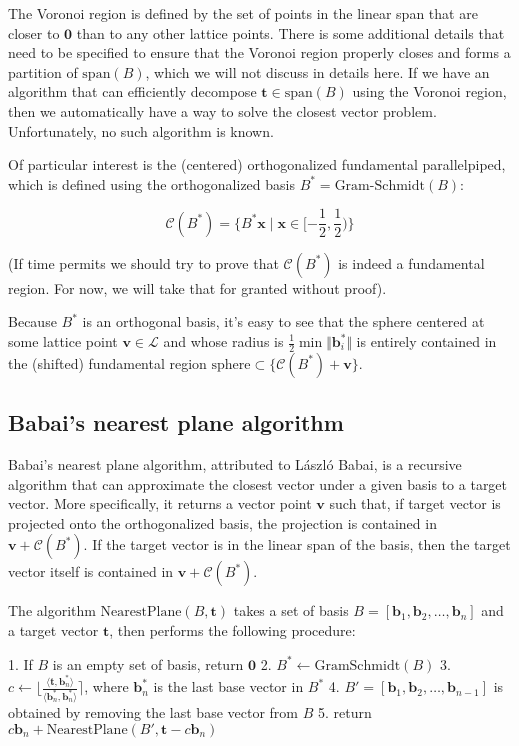 The Voronoi region is defined by the set of points in the linear span that are closer to $\mathbf{0}$ than to any other lattice points. There is some additional details that need to be specified to ensure that the Voronoi region properly closes and forms a partition of $\text{span}(B)$, which we will not discuss in details here. If we have an algorithm that can efficiently decompose $\mathbf{t} \in \text{span}(B)$ using the Voronoi region, then we automatically have a way to solve the closest vector problem. Unfortunately, no such algorithm is known.

Of particular interest is the (centered) orthogonalized fundamental parallelpiped, which is defined using the orthogonalized basis $B^\ast = \text{Gram-Schmidt}(B)$:

$$
\mathcal{C}(B^\ast) = \{B^\ast\mathbf{x} \mid \mathbf{x} \in [-\frac{1}{2}, \frac{1}{2})\}
$$

(If time permits we should try to prove that $\mathcal{C}(B^\ast)$ is indeed a fundamental region. For now, we will take that for granted without proof).

Because $B^\ast$ is an orthogonal basis, it's easy to see that the sphere centered at some lattice point $\mathbf{v} \in \mathcal{L}$ and whose radius is $\frac{1}{2}\min \Vert \mathbf{b}_i^\ast\Vert$ is entirely contained in the (shifted) fundamental region $\text{sphere} \subset \{\mathcal{C}(B^\ast) + \mathbf{v}\}$.

\subsection{Babai's nearest plane algorithm}
Babai's nearest plane algorithm, attributed to László Babai, is a recursive algorithm that can approximate the closest vector under a given basis to a target vector. More specifically, it returns a vector point $\mathbf{v}$ such that, if target vector is projected onto the orthogonalized basis, the projection is contained in $\mathbf{v} + \mathcal{C}(B^\ast)$. If the target vector is in the linear span of the basis, then the target vector itself is contained in $\mathbf{v} + \mathcal{C}(B^\ast)$.

The algorithm $\text{NearestPlane}(B, \mathbf{t})$ takes a set of basis $B = [\mathbf{b}_1, \mathbf{b}_2, \ldots, \mathbf{b}_{n}]$ and a target vector $\mathbf{t}$, then performs the following procedure:

1. If $B$ is an empty set of basis, return $\mathbf{0}$
2. $B^\ast \leftarrow \text{GramSchmidt}(B)$
3. $c \leftarrow \lfloor \frac{\langle\mathbf{t}, \mathbf{b}_n^\ast\rangle}{\langle\mathbf{b}_n^\ast, \mathbf{b}_n^\ast\rangle} \rceil$, where $\mathbf{b}_n^\ast$ is the last base vector in $B^\ast$
4. $B' = [\mathbf{b}_1, \mathbf{b}_2, \ldots, \mathbf{b}_{n-1}]$ is obtained by removing the last base vector from $B$
5. return $c\mathbf{b}_n + \text{NearestPlane}(B', \mathbf{t} - c\mathbf{b}_n)$

